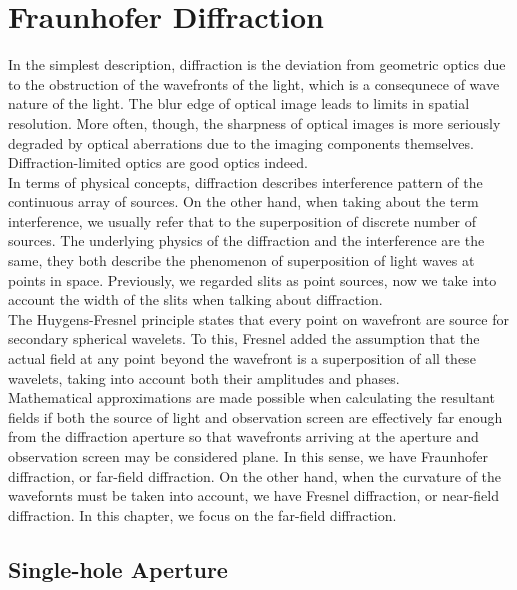 \documentclass[11pt]{book}
\theoremstyle{break}
\theoremstyle{break}
\begin{document}
\newpage
\chapter{Fraunhofer Diffraction}
In the simplest description, diffraction is the deviation from geometric optics due to the obstruction of the wavefronts of the light, which is a consequnece of wave nature of the light. The blur edge of optical image leads to limits in  spatial resolution. More often, though, the sharpness of optical images is more seriously degraded by optical aberrations due to the imaging components themselves. Diffraction-limited optics are good optics indeed.\\

In terms of physical concepts, diffraction describes interference pattern of the continuous array of sources. On the other hand, when taking about the term interference, we usually refer that to the superposition of discrete number of sources. The underlying physics of the diffraction and the interference are the same, they both describe the phenomenon of superposition of light waves at points in space. Previously, we regarded slits as point sources, now we take into account the width of the slits when talking about diffraction.\\

The Huygens-Fresnel principle states that every point on wavefront are source for secondary spherical wavelets. To this, Fresnel added the assumption that the actual field at any point beyond the wavefront is a superposition of all these wavelets, taking into account both their amplitudes and phases. \\


Mathematical approximations are made possible when calculating the resultant fields if both the source of light and observation screen are effectively far enough from the diffraction aperture so that wavefronts arriving at the aperture and observation
screen may be considered plane. In this sense, we have Fraunhofer diffraction, or far-field diffraction. On the other hand, when the curvature of the wavefornts must be taken into account, we have Fresnel diffraction, or near-field diffraction. In this chapter, we focus on the far-field diffraction.

\section[Single-hole Aperture]{\color{red} Single-hole Aperture \color{black}}
\end{document}
